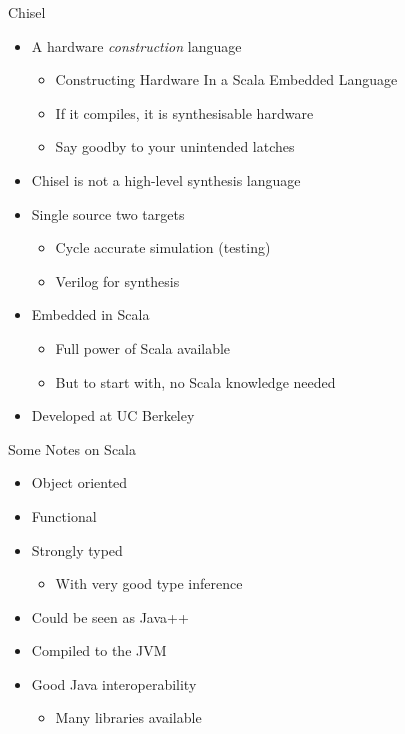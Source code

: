 \documentclass[xcolor=pdflatex,dvipsnames,table]{beamer}
\begin{document}
\begin{frame}[fragile]{Chisel}
\begin{itemize}
\item A hardware \emph{construction} language
\begin{itemize}
\item Constructing Hardware In a Scala Embedded Language
\item If it compiles, it is synthesisable hardware 
\item Say goodby to your unintended latches
\end{itemize}
\item Chisel is not a high-level synthesis language
\item Single source two targets
\begin{itemize}
\item Cycle accurate simulation (testing)
\item Verilog for synthesis
\end{itemize}
\item Embedded in Scala
\begin{itemize}
\item Full power of Scala available
\item But to start with, no Scala knowledge needed
\end{itemize}
\item Developed at UC Berkeley
\end{itemize}
\end{frame}

\begin{frame}[fragile]{Some Notes on Scala}
\begin{itemize}
\item Object oriented
\item Functional
\item Strongly typed
\begin{itemize}
\item With very good type inference
\end{itemize}
\item Could be seen as Java++
\item Compiled to the JVM
\item Good Java interoperability
\begin{itemize}
\item Many libraries available
\end{itemize}
\end{itemize}
\end{frame}
\end{document}

